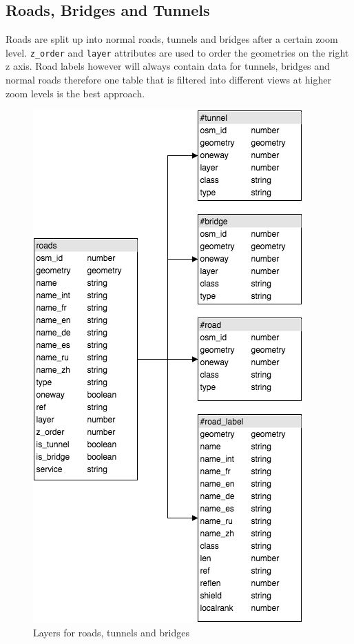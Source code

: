 \newpage
\subsection{Roads, Bridges and Tunnels}
Roads are split up into normal roads, tunnels and bridges after a certain zoom level. \texttt{z\_order} and \texttt{layer} attributes are used to order the geometries on the right z axis. Road labels however will always contain data for tunnels, bridges and normal roads therefore one table that is filtered into different views at higher zoom levels is the best approach.

\begin{figure}[H]
\centering
  \includegraphics[scale=0.6]{images/road_layer.png}
  \caption{Layers for roads, tunnels and bridges}
\end{figure}


